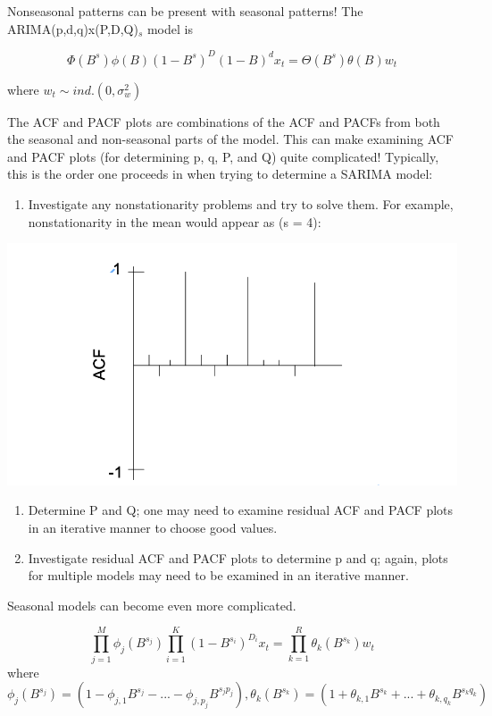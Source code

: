 \documentclass[
]{book}
\providecommand{\tightlist}{%
  \setlength{\itemsep}{0pt}\setlength{\parskip}{0pt}}
\theoremstyle{definition}
\theoremstyle{definition}
\theoremstyle{definition}
\theoremstyle{definition}
\theoremstyle{remark}
\begin{document}
Nonseasonal patterns can be present with seasonal patterns! The ARIMA(p,d,q)x(P,D,Q)\(_s\) model is

\[\Phi(B^s)\phi(B)(1-B^s)^D(1-B)^dx_t=\Theta(B^s)\theta(B)w_t\]

where \(w_t \sim ind.(0, \sigma_w^2)\)

The ACF and PACF plots are combinations of the ACF and PACFs from both the seasonal and non-seasonal parts of the model. This can make examining ACF and PACF plots (for determining p, q, P, and Q) quite complicated! Typically, this is the order one proceeds in when trying to determine a SARIMA model:

\begin{enumerate}
\def\labelenumi{\arabic{enumi}.}
\tightlist
\item
  Investigate any nonstationarity problems and try to solve them. For example, nonstationarity in the mean would appear as (s = 4):
\end{enumerate}

\includegraphics{SARIMA-graph1.png}

\begin{enumerate}
\def\labelenumi{\arabic{enumi}.}
\setcounter{enumi}{1}
\item
  Determine P and Q; one may need to examine residual ACF and PACF plots in an iterative manner to choose good values.
\item
  Investigate residual ACF and PACF plots to determine p and q; again, plots for multiple models may need to be examined in an iterative manner.
\end{enumerate}

Seasonal models can become even more complicated.

\[\prod^{M}_{j=1}\phi_j(B^{s_j})\prod_{i=1}^{K}(1-B^{s_i})^{D_i}x_t=\prod_{k=1}^{R}\theta_k(B^{s_k})w_t\]
where \(\phi_j(B^{s_j})=(1-\phi_{j,1}B^{s_j}-...-\phi_{j,p_j}B^{s_jp_j}), \theta_k(B^{s_k})=(1+\theta_{k,1}B^{s_k}+...+\theta_{k,q_k}B^{s_kq_k})\)
\end{document}
